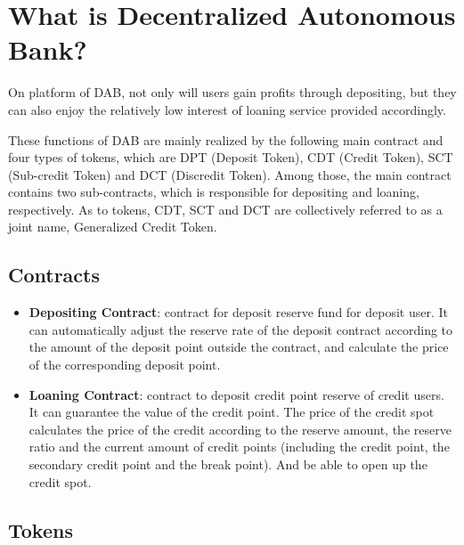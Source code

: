 \documentclass[a4paper, 10pt, conference]{ieeeconf} %
\begin{document}
\section{What is Decentralized Autonomous Bank?}

On platform of DAB, not only will users gain profits through depositing, but they can also enjoy the relatively low interest of loaning service provided accordingly.

These functions of DAB are mainly realized by the following main contract and four types of tokens, which are DPT (Deposit Token), CDT (Credit Token), SCT (Sub-credit Token) and DCT (Discredit Token). Among those, the main contract contains two sub-contracts, which is responsible for depositing and loaning, respectively. As to tokens, CDT, SCT and DCT are collectively referred to as a joint name, Generalized Credit Token.

\subsection{Contracts}

\begin{itemize} 
   \item \textbf{Depositing Contract}: contract for deposit reserve fund for deposit user. It can automatically adjust the reserve rate of the deposit contract according to the amount of the deposit point outside the contract, and calculate the price of the corresponding deposit point.
   \item \textbf{Loaning Contract}: contract to deposit credit point reserve of credit users. It can guarantee the value of the credit point. The price of the credit spot calculates the price of the credit according to the reserve amount, the reserve ratio and the current amount of credit points (including the credit point, the secondary credit point and the break point). And be able to open up the credit spot.
\end{itemize}

\subsection{Tokens}
\end{document}
